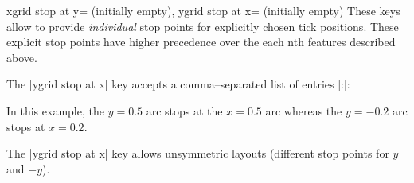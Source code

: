 \begin{pgfplotskeylist}{%
	xgrid stop at y= (initially empty),
	ygrid stop at x= (initially empty)}
	These keys allow to provide \emph{individual} stop points for explicitly chosen tick positions. These explicit stop points have higher precedence over the each nth features described above.

	The |ygrid stop at x| key accepts a comma--separated list of entries |:|:
\begin{codeexample}[]
\begin{tikzpicture}
	\begin{smithchart}[
		ygrid stop at x={0.5:0.5,-0.2:0.2}
	]
	\end{smithchart}
\end{tikzpicture}
\end{codeexample}
	\noindent In this example, the $y=0.5$ arc stops at the $x=0.5$ arc whereas the $y=-0.2$ arc stops at $x=0.2$.

	The |ygrid stop at x| key allows unsymmetric layouts (different stop points for $y$ and $-y$).
\end{pgfplotskeylist}
